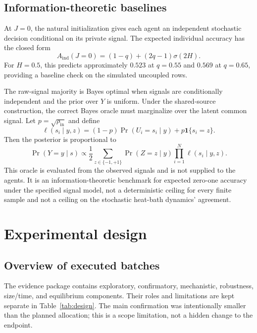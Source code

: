 \documentclass[11pt,a4paper]{article}
\begin{document}
\subsection{Information-theoretic baselines}

At $J=0$, the natural initialization gives each agent an independent stochastic decision conditional on its private signal. The expected individual accuracy has the closed form
\begin{equation}
A_{\mathrm{ind}}(J=0)=
(1-q)+(2q-1)\sigma(2H).
\label{eq:j0baseline}
\end{equation}
For $H=0.5$, this predicts approximately $0.523$ at $q=0.55$ and $0.569$ at $q=0.65$, providing a baseline check on the simulated uncoupled rows.

The raw-signal majority is Bayes optimal when signals are conditionally independent and the prior over $Y$ is uniform. Under the shared-source construction, the correct Bayes oracle must marginalize over the latent common signal. Let $p=\sqrt{\rho_{\mathrm{in}}}$ and define
\[
\ell(s_i\mid y,z)=(1-p)\Pr(U_i=s_i\mid y)+p\mathbf{1}\{s_i=z\}.
\]
Then the posterior is proportional to
\begin{equation}
\Pr(Y=y\mid s)\propto \frac{1}{2}\sum_{z\in\{-1,+1\}}
\Pr(Z=z\mid y)\prod_{i=1}^{N}\ell(s_i\mid y,z).
\label{eq:oracle}
\end{equation}
This oracle is evaluated from the observed signals and is not supplied to the agents. It is an information-theoretic benchmark for expected zero-one accuracy under the specified signal model, not a deterministic ceiling for every finite sample and not a ceiling on the stochastic heat-bath dynamics' agreement.

\section{Experimental design}

\subsection{Overview of executed batches}

The evidence package contains exploratory, confirmatory, mechanistic, robustness, size/time, and equilibrium components. Their roles and limitations are kept separate in Table~\ref{tab:design}. The main confirmation was intentionally smaller than the planned allocation; this is a scope limitation, not a hidden change to the endpoint.
\end{document}

